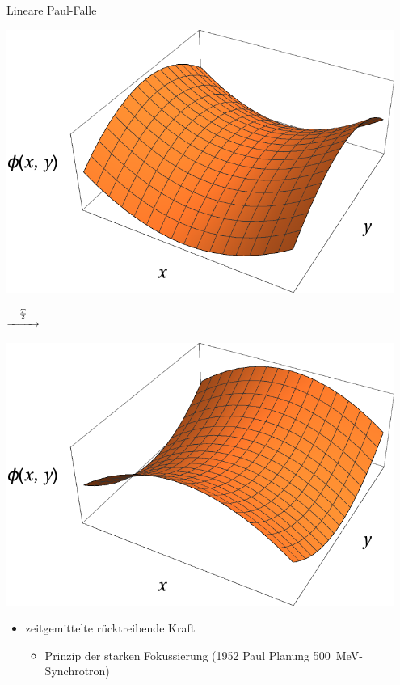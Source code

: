 \documentclass[12pt,xcolor=dvipsnames]{beamer}
\begin{document}
\begin{frame}{Lineare Paul-Falle}
	\begin{minipage}[t]{0.45\textwidth}
		\centering
		\includegraphics[width=0.95\textwidth]{./figures/sattelpotential.pdf}
	\end{minipage}%
	\begin{minipage}[c]{0.1\textwidth}
		$\stackrel{\frac{T}{2}}{\xrightarrow{\hspace*{.8cm}}}$
	\end{minipage}%
	\begin{minipage}[t]{0.45\textwidth}
		\centering
		\includegraphics[width=0.95\textwidth]{./figures/sattelpotential2.pdf}
	\end{minipage}
	\vspace{0.3cm}
	\begin{itemize}
		\item \alert{zeitgemittelte} rücktreibende Kraft
		\begin{itemize}
			\item Prinzip der starken Fokussierung (1952 Paul Planung \SI{500}{MeV}-Synchrotron)
		\end{itemize}
	\end{itemize}
\end{frame}
\end{document}
